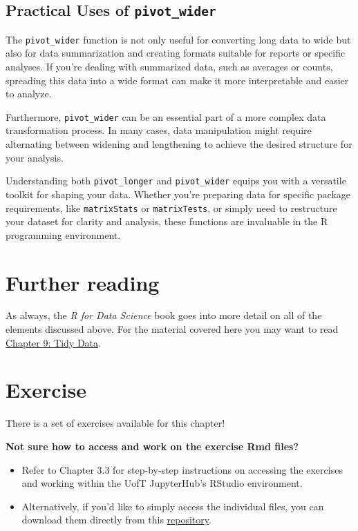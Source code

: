 \documentclass[
]{book}
\begin{document}
\hypertarget{practical-uses-of-pivot_wider}{%
\subsection{\texorpdfstring{Practical Uses of \texttt{pivot\_wider}}{Practical Uses of pivot\_wider}}\label{practical-uses-of-pivot_wider}}

The \texttt{pivot\_wider} function is not only useful for converting long data to wide but also for data summarization and creating formats suitable for reports or specific analyses. If you're dealing with summarized data, such as averages or counts, spreading this data into a wide format can make it more interpretable and easier to analyze.

Furthermore, \texttt{pivot\_wider} can be an essential part of a more complex data transformation process. In many cases, data manipulation might require alternating between widening and lengthening to achieve the desired structure for your analysis.

Understanding both \texttt{pivot\_longer} and \texttt{pivot\_wider} equips you with a versatile toolkit for shaping your data. Whether you're preparing data for specific package requirements, like \texttt{matrixStats} or \texttt{matrixTests}, or simply need to restructure your dataset for clarity and analysis, these functions are invaluable in the R programming environment.

\hypertarget{further-reading-4}{%
\section{Further reading}\label{further-reading-4}}

As always, the \emph{R for Data Science} book goes into more detail on all of the elements discussed above. For the material covered here you may want to read \href{https://r4ds.had.co.nz/tidy-data.html}{Chapter 9: Tidy Data}.

\hypertarget{exercise-7}{%
\section{Exercise}\label{exercise-7}}

There is a set of exercises available for this chapter!

\textbf{Not sure how to access and work on the exercise Rmd files? }

\begin{itemize}
\item
  Refer to Chapter 3.3 for step-by-step instructions on accessing the exercises and working within the UofT JupyterHub's RStudio environment.
\item
  Alternatively, if you'd like to simply access the individual files, you can download them directly from this \href{https://github.com/UofTChem-Teaching/R4EnvChem-Exercises}{repository}.
\end{itemize}
\end{document}
